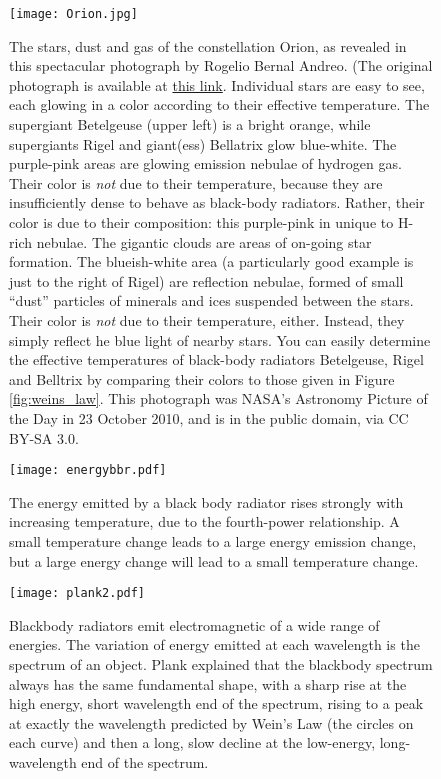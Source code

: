 \begin{figure}[p]
\centering
\texttt{[image: Orion.jpg]}%
\caption{The stars, dust and gas of the constellation Orion, as revealed in this spectacular photograph by Rogelio Bernal Andreo. (The original photograph is available at \href{http://deepskycolors.com/astro/JPEG/RBA_Orion_HeadToToes.jpg}{this link}. Individual stars are easy to see, each glowing in a color according to their effective temperature. The supergiant Betelgeuse (upper left) is a bright orange, while supergiants Rigel and giant(ess) Bellatrix glow blue-white. The purple-pink areas are glowing emission nebulae of hydrogen gas. Their color is \emph{not} due to their temperature, because they are insufficiently dense to behave as black-body radiators. Rather, their color is due to their composition: this purple-pink in unique to H-rich nebulae. The gigantic clouds are areas of on-going star formation. The blueish-white area (a particularly good example is just to the right of Rigel) are reflection nebulae, formed of small ``dust'' particles of minerals and ices suspended between the stars. Their color is \emph{not}  due to their temperature, either. Instead, they simply reflect he blue light of nearby stars. You can easily determine the effective temperatures of black-body radiators Betelgeuse, Rigel and Belltrix by comparing their colors to those given in Figure \ref{fig:weins_law}. This photograph was NASA's Astronomy Picture of the Day in 23 October 2010, and is in the public domain, via CC BY-SA 3.0.}
\label{fig:Orion}
\end{figure}

\begin{figure}[p]
\centering
\texttt{[image: energybbr.pdf]}%
\caption{The energy emitted by a black body radiator rises strongly with increasing temperature, due to the fourth-power relationship. A small temperature change leads to a large energy emission change, but a large energy change will lead to a small temperature change. }
\label{fig:energybbr}
\end{figure}


\begin{figure}[p]
\centering
\texttt{[image: plank2.pdf]}%
\caption{Blackbody radiators emit electromagnetic of a wide range of energies. The variation of energy emitted at each wavelength is the spectrum of an object. Plank explained that the blackbody spectrum always has the same fundamental shape, with a sharp rise at the high energy, short wavelength end of the spectrum, rising to a peak at exactly the wavelength predicted by Wein's Law (the circles on each curve) and then a long, slow decline at the low-energy, long-wavelength end of the spectrum.  }
\label{fig:planks}
\end{figure}

